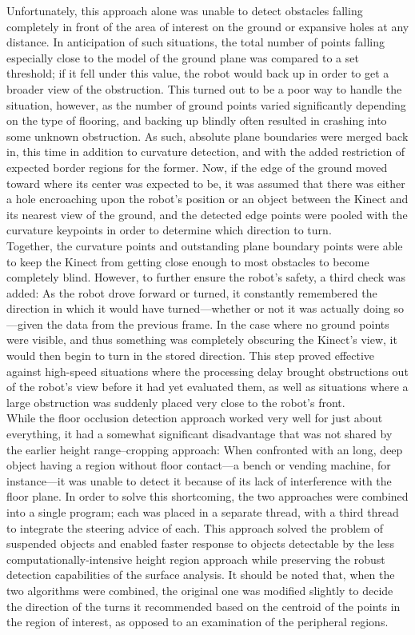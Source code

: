 \documentclass[12pt]{report}
\begin{document}
Unfortunately, this approach alone was unable to detect obstacles falling completely in front of the area of interest on the ground or expansive holes at any distance.  In anticipation of such situations, the total number of points falling especially close to the model of the ground plane was compared to a set threshold; if it fell under this value, the robot would back up in order to get a broader view of the obstruction.  This turned out to be a poor way to handle the situation, however, as the number of ground points varied significantly depending on the type of flooring, and backing up blindly often resulted in crashing into some unknown obstruction.  As such, absolute plane boundaries were merged back in, this time in addition to curvature detection, and with the added restriction of expected border regions for the former.  Now, if the edge of the ground moved toward where its center was expected to be, it was assumed that there was either a hole encroaching upon the robot's position or an object between the Kinect and its nearest view of the ground, and the detected edge points were pooled with the curvature keypoints in order to determine which direction to turn. \\
Together, the curvature points and outstanding plane boundary points were able to keep the Kinect from getting close enough to most obstacles to become completely blind.  However, to further ensure the robot's safety, a third check was added:  As the robot drove forward or turned, it constantly remembered the direction in which it would have turned---whether or not it was actually doing so---given the data from the previous frame.  In the case where no ground points were visible, and thus something was completely obscuring the Kinect's view, it would then begin to turn in the stored direction.  This step proved effective against high-speed situations where the processing delay brought obstructions out of the robot's view before it had yet evaluated them, as well as situations where a large obstruction was suddenly placed very close to the robot's front. \\
While the floor occlusion detection approach worked very well for just about everything, it had a somewhat significant disadvantage that was not shared by the earlier height range--cropping approach:  When confronted with an long, deep object having a region without floor contact---a bench or vending machine, for instance---it was unable to detect it because of its lack of interference with the floor plane.  In order to solve this shortcoming, the two approaches were combined into a single program; each was placed in a separate thread, with a third thread to integrate the steering advice of each.  This approach solved the problem of suspended objects and enabled faster response to objects detectable by the less computationally-intensive height region approach while preserving the robust detection capabilities of the surface analysis.  It should be noted that, when the two algorithms were combined, the original one was modified slightly to decide the direction of the turns it recommended based on the centroid of the points in the region of interest, as opposed to an examination of the peripheral regions. \\
\end{document}
